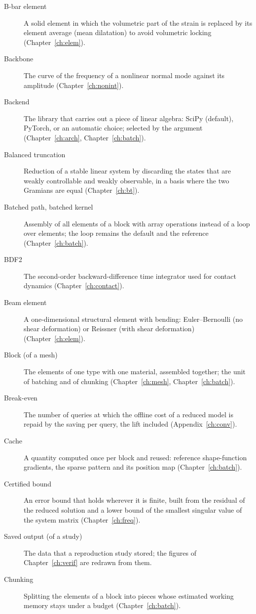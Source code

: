 \begin{description}
\item[B-bar element] A solid element in which the volumetric part of the strain is replaced by its element average (mean dilatation) to avoid volumetric locking (Chapter~\ref{ch:elem}).
\item[Backbone] The curve of the frequency of a nonlinear normal mode against its amplitude (Chapter~\ref{ch:nonint}).
\item[Backend] The library that carries out a piece of linear algebra: SciPy (default), PyTorch, or an automatic choice; selected by the argument  (Chapter~\ref{ch:arch}, Chapter~\ref{ch:batch}).
\item[Balanced truncation] Reduction of a stable linear system by discarding the states that are weakly controllable and weakly observable, in a basis where the two Gramians are equal (Chapter~\ref{ch:bt}).
\item[Batched path, batched kernel] Assembly of all elements of a block with array operations instead of a loop over elements; the loop remains the default and the reference (Chapter~\ref{ch:batch}).
\item[BDF2] The second-order backward-difference time integrator used for contact dynamics (Chapter~\ref{ch:contact}).
\item[Beam element] A one-dimensional structural element with bending: Euler--Bernoulli (no shear deformation) or Reissner (with shear deformation) (Chapter~\ref{ch:elem}).
\item[Block (of a mesh)] The elements of one type with one material, assembled together; the unit of batching and of chunking (Chapter~\ref{ch:mesh}, Chapter~\ref{ch:batch}).
\item[Break-even] The number of queries at which the offline cost of a reduced model is repaid by the saving per query, the lift included (Appendix~\ref{ch:conv}).
\item[Cache] A quantity computed once per block and reused: reference shape-function gradients, the sparse pattern and its position map (Chapter~\ref{ch:batch}).
\item[Certified bound] An error bound that holds wherever it is finite, built from the residual of the reduced solution and a lower bound of the smallest singular value of the system matrix (Chapter~\ref{ch:freq}).
\item[Saved output (of a study)] The data that a reproduction study stored; the figures of Chapter~\ref{ch:verif} are redrawn from them.
\item[Chunking] Splitting the elements of a block into pieces whose estimated working memory stays under a budget (Chapter~\ref{ch:batch}).

\end{description}
